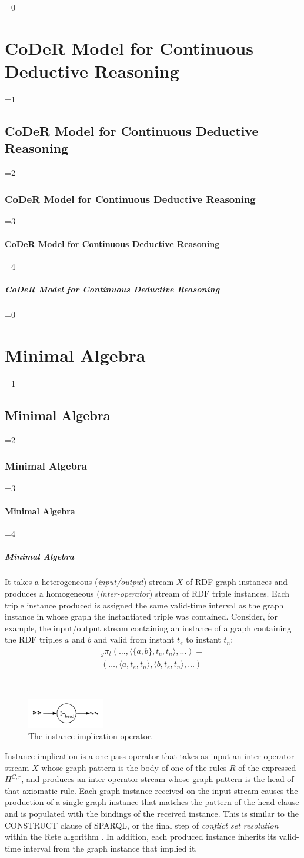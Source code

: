 \documentclass[twocolumn,preprint,3p,number]{elsarticle}
\theoremstyle{plain}
\theoremstyle{definition}
\newcounter{nestingdepth}
\newenvironment{nestedsection}[2]{
  \ifnum\value{nestingdepth}=0
    \chapter{#1}
  \else
    \ifnum\value{nestingdepth}=1
      \section{#1}
    \else
      \ifnum\value{nestingdepth}=2
        \subsection{#1}
      \else
        \ifnum\value{nestingdepth}=3
          \subsubsection{#1}
        \else
          \ifnum\value{nestingdepth}=4
            \paragraph{#1}
          \else
            \PackageError{nestedsections}{Maximum nesting level exceeded!}{uh oh!}
          \fi
        \fi
      \fi
    \fi
  \fi
  \addtocounter{nestingdepth}{1}
  \label{sec:#2}
}{\addtocounter{nestingdepth}{-1}}
\def\labelfig#1{\label{fig:#1}}
\def\rstreamjoin{\mathbin{\rhd\mkern-2mu%
  \setbox0=\hbox{$\rhd$}%
    \rule[0.21em]{.5em}{.4pt}%
}}
\begin{document}
\begin{nestedsection}{CoDeR Model for Continuous Deductive Reasoning}{model}
\begin{nestedsection}{Minimal Algebra}{model: algebra}
\begin{description}
        It takes a heterogeneous (\emph{input/output}) stream $X$ of RDF graph instances and produces a homogeneous (\emph{inter-operator}) stream of RDF triple instances.
        Each triple instance produced is assigned the same valid-time interval as the graph instance in whose graph the instantiated triple was contained.
        Consider, for example, the input/output stream containing an instance of a graph containing the RDF triples $a$ and $b$ and valid from instant $t_e$ to instant $t_n$:
        \begin{multline*}
          {}_g{\pi_t} (\dots,\langle \{a,b\},t_e,t_n \rangle,\dots) = \\
            (\dots,\langle a,t_e,t_n \rangle,\langle b,t_e,t_n \rangle,\dots)
        \end{multline*}
      \item[$\text{:-}_{head}\,X$] \hfill \\
        \begin{figure}[b]
          \centering
          \includegraphics[width=0.3\textwidth]{instance-implication}
          \caption{The instance implication operator.}
          \labelfig{continuous datalog: instance implication}
        \end{figure}
        Instance implication is a one-pass operator that takes as input an inter-operator stream $X$ whose graph pattern is the body of one of the rules $R$ of the expressed $\Pi^{C,r}$, and produces an inter-operator stream whose graph pattern is the head of that axiomatic rule.
        Each graph instance received on the input stream causes the production of a single graph instance that matches the pattern of the head clause and is populated with the bindings of the received instance.
        This is similar to the CONSTRUCT clause of SPARQL, or the final step of \emph{conflict set resolution} within the Rete algorithm \citep{forgy79}.
        In addition, each produced instance inherits its valid-time interval from the graph instance that implied it.
      \item[${X\,\rstreamjoin\,Y}$] \hfill \\
        \begin{figure}[t]
          \centering

\end{figure}
\end{description}
\end{nestedsection}
\end{nestedsection}
\end{document}

